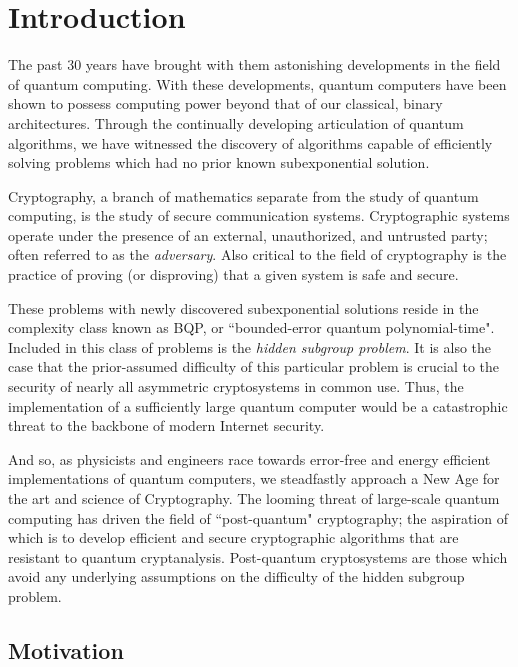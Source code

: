 \chapter{Introduction}

The past 30 years have brought with them astonishing developments in the field of quantum computing. With these developments, quantum computers have been shown to possess computing power beyond that of our classical, binary architectures. Through the continually developing articulation of quantum algorithms, we have witnessed the discovery of algorithms capable of efficiently solving problems which had no prior known subexponential solution. 

Cryptography, a branch of mathematics separate from the study of quantum computing, is the study of secure communication systems. Cryptographic systems operate under the presence of an external, unauthorized, and untrusted party; often referred to as the \textit{adversary}. Also critical to the field of cryptography is the practice of proving (or disproving) that a given system is safe and secure.

These problems with newly discovered subexponential solutions reside in the complexity class known as BQP, or ``bounded-error quantum polynomial-time". Included in this class of problems is the \textit{hidden subgroup problem}. It is also the case that the prior-assumed difficulty of this particular problem is crucial to the security of nearly all asymmetric cryptosystems in common use. Thus, the implementation of a sufficiently large quantum computer would be a catastrophic threat to the backbone of modern Internet security.  

And so, as physicists and engineers race towards error-free and energy efficient implementations of quantum computers, we steadfastly approach a New Age for the art and science of Cryptography. The looming threat of large-scale quantum computing has driven the field of ``post-quantum" cryptography; the aspiration of which is to develop efficient and secure cryptographic algorithms that are resistant to quantum cryptanalysis. Post-quantum cryptosystems are those which avoid any underlying assumptions on the difficulty of the hidden subgroup problem.\\

\section{Motivation}
\label{sec:motivation}

